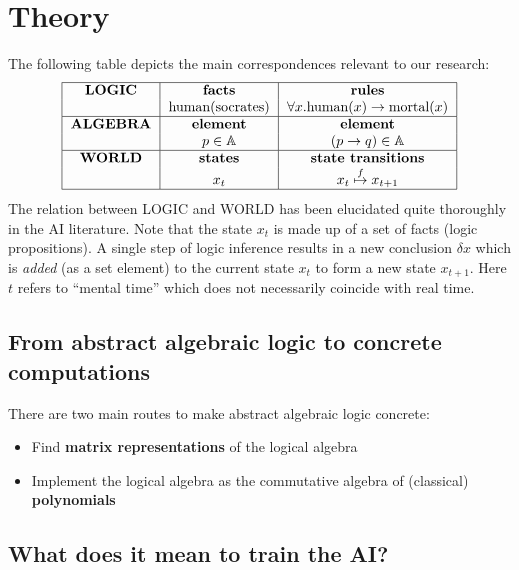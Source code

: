 \chapter{Theory}\label{chap:theory}

The following table depicts the main correspondences relevant to our research:
\begin{equation}
\begin{tabular}{|c|c|c|}
\hline
\textbf{LOGIC} & \textbf{facts} & \textbf{rules} \\
& \mbox{human(socrates)} & $\forall x. \mbox{human}(x) \rightarrow \mbox{mortal}(x)$ \\
\hline
\textbf{ALGEBRA} & \textbf{element} & \textbf{element} \\
& $p \in \mathbb{A} $ & $(p \rightarrow q) \in \mathbb{A} $ \\
\hline
\textbf{WORLD} & \textbf{states} & \textbf{state transitions} \\
& $x_t$ & $x_t \stackrel{f}{\mapsto} x_{t+1}$ \\
\hline
\end{tabular}
\end{equation}
The relation between LOGIC and WORLD has been elucidated quite thoroughly in the AI literature.  Note that the state $x_t$ is made up of a set of facts (logic propositions).  A single step of logic inference results in a new conclusion $\delta x$ which is \textit{added} (as a set element) to the current state $x_t$ to form a new state $x_{t+1}$.  Here $t$ refers to ``mental time'' which does not necessarily coincide with real time.

\section{From abstract algebraic logic to concrete computations}

There are two main routes to make abstract algebraic logic concrete:
\begin{itemize}
	\item Find \textbf{matrix representations} of the logical algebra
	\item Implement the logical algebra as the commutative algebra of (classical) \textbf{polynomials}
\end{itemize}

\section{What does it mean to train the AI?}

